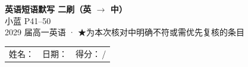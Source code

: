\documentclass[10pt,a4paper]{article}
\newcommand{\STAR}{\textcolor{wrongred}{\starfont ★}}
\begin{document}
\pagestyle{plain}

\begin{center}
{\LARGE\bfseries 英语短语默写 \quad 二刷（英 $\to$ 中）}\\[0.25em]
{\large 小蓝 P41--50}\\[0.22em]
{\small 2029 届高一英语 · \STAR 为本次核对中明确不符或需优先复核的条目}
\end{center}

\vspace{0.35em}
\noindent\begin{tabular}{@{}p{}@{}p{}@{}p{}@{}}
姓名：\underline{\hspace{2.2cm}} & 日期：\underline{\hspace{2.2cm}} & 得分：\underline{\hspace{1.5cm}}\,/\enspace 25 \\
\end{tabular}

\vspace{0.45em}
\end{document}
